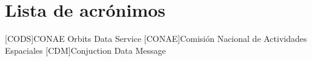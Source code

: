 \chapter*{Lista de acrónimos}
\label{chap:acronimos}

\begin{acronym}

[CODS]{CONAE Orbits Data Service}
[CONAE]{Comisión Nacional de Actividades Espaciales}
[CDM]{Conjuction Data Message}

\end{acronym}


